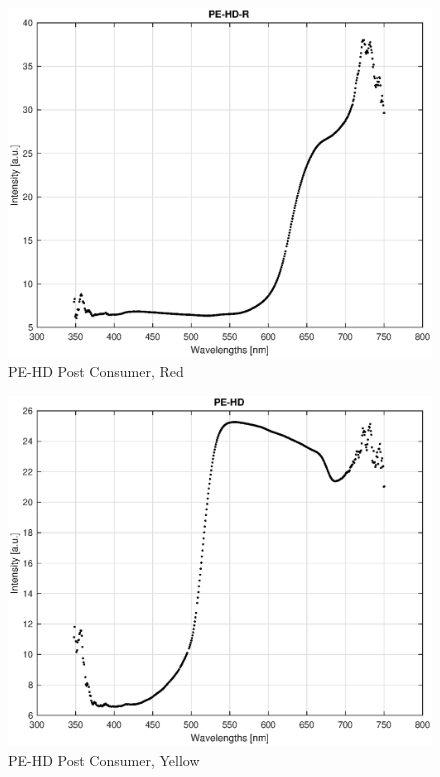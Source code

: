 \begin{appendices}
\begin{figure}
    \centering
    \includegraphics[width = 12cm]{Images/appendix/pe-hd-postconsum-red.eps}
    \caption{PE-HD Post Consumer, Red}
    \label{fig:pehd-red}
\end{figure}

\begin{figure}
    \centering
    \includegraphics[width = 12cm]{Images/appendix/pe-hd-postconsum.eps}
    \caption{PE-HD Post Consumer, Yellow}
    \label{fig:pehd-yellow}
\end{figure}


\end{appendices}
